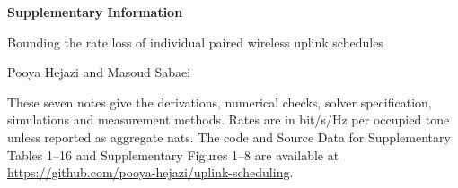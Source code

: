 \documentclass[10pt,letterpaper]{article}
\begin{document}
\begin{center}
{\Large\bfseries Supplementary Information\par}
\medskip
{\large Bounding the rate loss of individual paired wireless uplink schedules\par}
\medskip
Pooya Hejazi and Masoud Sabaei
\end{center}
\noindent These seven notes give the derivations, numerical checks, solver specification, simulations and measurement methods. Rates are in bit/s/Hz per occupied tone unless reported as aggregate nats. The code and Source Data for Supplementary Tables 1--16 and Supplementary Figures 1--8 are available at \url{https://github.com/pooya-hejazi/uplink-scheduling}.

\FloatBarrier

\FloatBarrier

\FloatBarrier

\FloatBarrier

\FloatBarrier

\FloatBarrier

\clearpage
\renewcommand{\refname}{Supplementary References}

\end{document}
